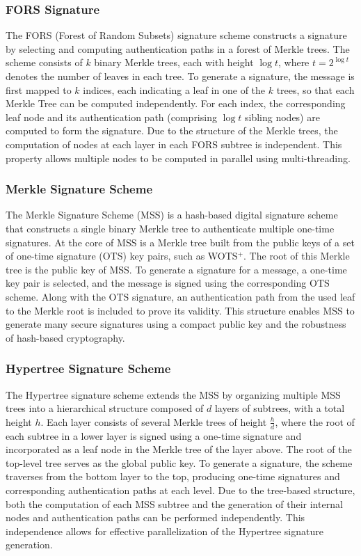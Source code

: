 \documentclass[10pt,conference]{IEEEtran}
\begin{document}
\subsubsection{FORS Signature}
The FORS (Forest of Random Subsets) signature scheme constructs a signature by selecting and computing authentication paths in a forest of Merkle trees. The scheme consists of $k$ binary Merkle trees, each with height $\log t$, where $t = 2^{\log t}$ denotes the number of leaves in each tree. To generate a signature, the message is first mapped to $k$ indices, each indicating a leaf in one of the $k$ trees, so that each Merkle Tree can be computed independently. For each index, the corresponding leaf node and its authentication path (comprising $\log t$ sibling nodes) are computed to form the signature. Due to the structure of the Merkle trees, the computation of nodes at each layer in each FORS subtree is independent. This property allows multiple nodes to be computed in parallel using multi-threading.

\subsubsection{Merkle Signature Scheme}
The Merkle Signature Scheme (MSS) is a hash-based digital signature scheme that constructs a single binary Merkle tree to authenticate multiple one-time signatures. At the core of MSS is a Merkle tree built from the public keys of a set of one-time signature (OTS) key pairs, such as WOTS$^+$. The root of this Merkle tree is the public key of MSS. To generate a signature for a message, a one-time key pair is selected, and the message is signed using the corresponding OTS scheme. Along with the OTS signature, an authentication path from the used leaf to the Merkle root is included to prove its validity. This structure enables MSS to generate many secure signatures using a compact public key and the robustness of hash-based cryptography.


\subsubsection{Hypertree Signature Scheme}
The Hypertree signature scheme extends the MSS by organizing multiple MSS trees into a hierarchical structure composed of $d$ layers of subtrees, with a total height $h$. Each layer consists of several Merkle trees of height $\frac{h}{d}$, where the root of each subtree in a lower layer is signed using a one-time signature and incorporated as a leaf node in the Merkle tree of the layer above. The root of the top-level tree serves as the global public key. To generate a signature, the scheme traverses from the bottom layer to the top, producing one-time signatures and corresponding authentication paths at each level. Due to the tree-based structure, both the computation of each MSS subtree and the generation of their internal nodes and authentication paths can be performed independently. This independence allows for effective parallelization of the Hypertree signature generation.
\end{document}
